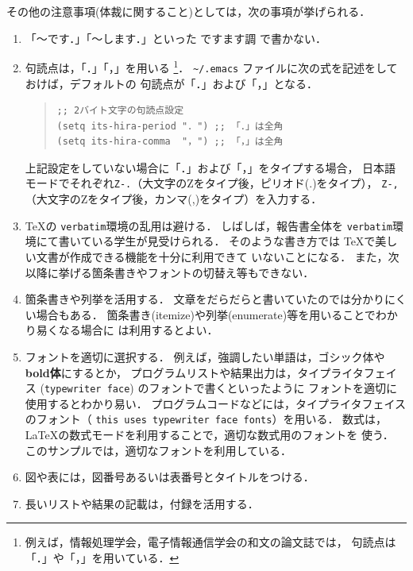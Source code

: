 \documentclass{jarticle}[11pt]
\begin{document}
その他の注意事項(体裁に関すること)としては，次の事項が挙げられる．
\begin{enumerate}
\item 「〜です．」「〜します．」といった {\gt ですます調} で書かない．

\item 句読点は，「．」「，」を用いる
\footnote{例えば，情報処理学会，電子情報通信学会の和文の論文誌では，
句読点は「．」や「，」を用いている．}．
\verb|~/.emacs| ファイルに次の式を記述をしておけば，デフォルトの
句読点が「．」および「，」となる．
\begin{quote}
\begin{verbatim}
;; 2バイト文字の句読点設定 
(setq its-hira-period "．") ;; 「．」は全角
(setq its-hira-comma  "，") ;; 「，」は全角
\end{verbatim}
\end{quote}
上記設定をしていない場合に「．」および「，」をタイプする場合，
日本語モードでそれぞれ\verb|Z-.|（大文字のZをタイプ後，ピリオド(.)をタイプ），
\verb|Z-,|（大文字のZをタイプ後，カンマ(,)をタイプ）を入力する．

\item \TeX の \verb|verbatim|環境の乱用は避ける．
しばしば，報告書全体を \verb|verbatim|環境にて書いている学生が見受けられる．
そのような書き方では \TeX で美しい文書が作成できる機能を十分に利用できて
いないことになる．
また，次以降に挙げる箇条書きやフォントの切替え等もできない．

\item 箇条書きや列挙を活用する．
文章をだらだらと書いていたのでは分かりにくい場合もある．
箇条書き(itemize)や列挙(enumerate)等を用いることでわかり易くなる場合に
は利用するとよい．
\item フォントを適切に選択する．
例えば，強調したい単語は，{\gt ゴシック体}や{\gt \bf bold体}にするとか，
プログラムリストや結果出力は，タイプライタフェイス
(\verb|typewriter face|) のフォントで書くといったように
フォントを適切に使用するとわかり易い．
プログラムコードなどには，タイプライタフェイスのフォント（
\verb|this uses typewriter face fonts|）を用いる．
数式は，\LaTeX の数式モードを利用することで，適切な数式用のフォントを
使う．
このサンプルでは，適切なフォントを利用している．
\item 図や表には，図番号あるいは表番号とタイトルをつける．
\item 長いリストや結果の記載は，付録を活用する．
\end{enumerate}
\end{document}
